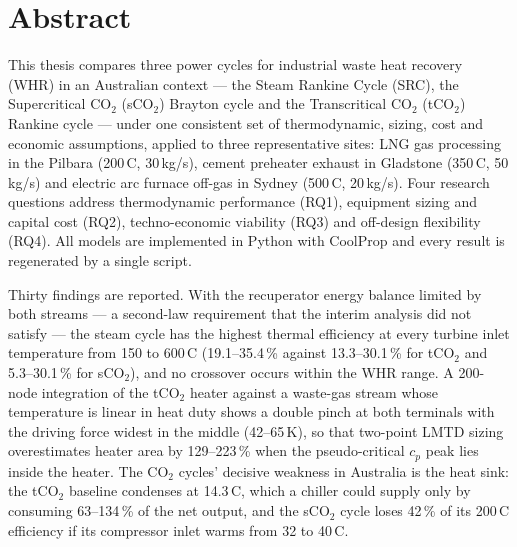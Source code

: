\pagestyle{plain}

\chapter*{Abstract}

This thesis compares three power cycles for industrial waste heat recovery
(WHR) in an Australian context --- the Steam Rankine Cycle (SRC), the
Supercritical CO$_2$ (sCO$_2$) Brayton cycle and the Transcritical CO$_2$
(tCO$_2$) Rankine cycle --- under one consistent set of thermodynamic,
sizing, cost and economic assumptions, applied to three representative
sites: LNG gas processing in the Pilbara (200\,\textdegree C, 30\,kg/s),
cement preheater exhaust in Gladstone (350\,\textdegree C, 50\,kg/s) and
electric arc furnace off-gas in Sydney (500\,\textdegree C, 20\,kg/s). Four
research questions address thermodynamic performance (RQ1), equipment sizing
and capital cost (RQ2), techno-economic viability (RQ3) and off-design
flexibility (RQ4). All models are implemented in Python with CoolProp and
every result is regenerated by a single script.

Thirty findings are reported. With the recuperator energy balance limited by
both streams --- a second-law requirement that the interim analysis did not
satisfy --- the steam cycle has the highest thermal efficiency at every
turbine inlet temperature from 150 to 600\,\textdegree C (19.1--35.4\,\%
against 13.3--30.1\,\% for tCO$_2$ and 5.3--30.1\,\% for sCO$_2$), and no
crossover occurs within the WHR range. A 200-node integration of the tCO$_2$
heater against a waste-gas stream whose temperature is linear in heat duty
shows a double pinch at both terminals with the driving force widest in the
middle (42--65\,K), so that two-point LMTD sizing overestimates heater area
by 129--223\,\% when the pseudo-critical $c_p$ peak lies inside the heater.
The CO$_2$ cycles' decisive weakness in Australia is the heat sink: the
tCO$_2$ baseline condenses at 14.3\,\textdegree C, which a chiller could
supply only by consuming 63--134\,\% of the net output, and the sCO$_2$ cycle
loses 42\,\% of its 200\,\textdegree C efficiency if its compressor inlet
warms from 32 to 40\,\textdegree C.

